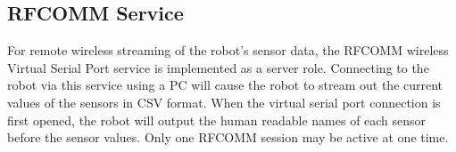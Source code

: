 \subsection{RFCOMM Service}

For remote wireless streaming of the robot's sensor data, the RFCOMM wireless Virtual Serial Port service is implemented as a server role. Connecting to the robot via this service using a PC will cause the robot to stream out the current values of the sensors in CSV format. When the virtual serial port connection is first opened, the robot will output the human readable names of each sensor before the sensor values. Only one RFCOMM session may be active at one time.